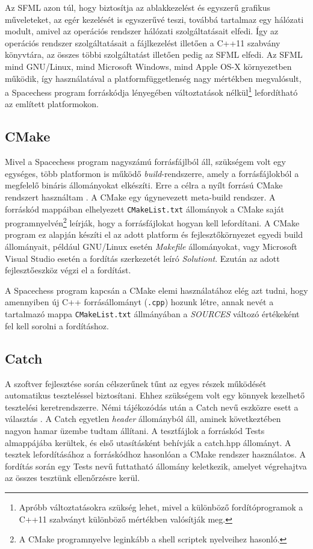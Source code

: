 \documentclass[12pt, twoside]{report}
\begin{document}
Az SFML azon túl, hogy biztosítja az ablakkezelést és egyszerű grafikus műveleteket, az egér kezelését is egyszerűvé teszi, továbbá tartalmaz egy hálózati modult, amivel az operációs rendszer hálózati szolgáltatásait elfedi. Így az operációs rendszer szolgáltatásait a fájlkezelést illetően a C++11 szabvány könyvtára, az összes többi szolgáltatást illetően pedig az SFML elfedi. Az SFML mind GNU/Linux, mind Microsoft Windows, mind Apple OS-X környezetben működik, így használatával a platformfüggetlenség nagy mértékben megvalósult, a Spacechess program forráskódja lé\-nye\-gé\-ben változtatások nélkül\footnote{Apróbb változtatásokra szükség lehet, mivel a különböző fordítóprogramok a C++11 szabványt különböző mértékben valósítják meg.} lefordítható az említett platformokon. 

\subsection{CMake}

Mivel a Spacechess program nagyszámú forrásfájlból áll, szükségem volt egy egységes, több platformon is működő \emph{build}-rendszerre, amely a forrásfájlokból a megfelelő bináris állományokat elkészíti. Erre a célra a nyílt forrású CMake rendszert használtam \cite{cmake}. A CMake egy úgynevezett meta-build rendszer. A forráskód mappáiban elhelyezett {\tt CMakeList.txt} állományok a CMake saját programnyelvén\footnote{A CMake programnyelve leginkább a shell scriptek nyelveihez hasonló.} leírják, hogy a for\-rás\-fáj\-lo\-kat hogyan kell lefordítani. A CMake program ez alapján készíti el az adott platform és fejlesztőkörnyezet egyedi build állományait, például GNU/Linux esetén \emph{Makefile} állományokat, vagy Microsoft Visual Studio esetén a fordítás szerkezetét leíró \emph{Solutiont}. Ezután az adott fejlesztőeszköz végzi el a fordítást.

A Spacechess program kapcsán a CMake elemi használatához elég azt tudni, hogy amennyiben új C++ forrásállományt ({\tt *.cpp}) hozunk létre, annak nevét a tartalmazó mappa {\tt CMakeList.txt} állmányában a \emph{SOURCES} változó értékeként fel kell sorolni a fordításhoz.

\subsection{Catch}

A szoftver fejlesztése során célszerűnek tűnt az egyes részek működését automatikus teszteléssel biztosítani. Ehhez szükségem volt egy könnyek kezelhető tesztelési keretrendszerre. Némi tájékozódás után a Catch nevű eszközre esett a választás \cite{catch}. A Catch egyetlen \emph{header} állományból áll, aminek következtében nagyon hamar üzembe tudtam állítani. A tesztfájlok a forráskód Tests almappájába kerültek, és első utasításként behívják a catch.hpp állományt. A tesztek lefordításához a forráskódhoz hasonlóan a CMake rendszer használatos. A fordítás során egy Tests nevű futtatható állomány keletkezik, amelyet végrehajtva az összes tesztünk ellenőrzésre kerül.
\end{document}
